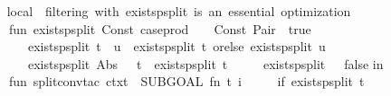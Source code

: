 \begin{isabellebody}
\ {\isacartoucheopen}\isanewline
local\ {\isacharparenleft}{\kern0pt}{\isacharasterisk}{\kern0pt}\ filtering\ with\ exists{\isacharunderscore}{\kern0pt}p{\isacharunderscore}{\kern0pt}split\ is\ an\ essential\ optimization\ {\isacharasterisk}{\kern0pt}{\isacharparenright}{\kern0pt}\isanewline
\ \ fun\ exists{\isacharunderscore}{\kern0pt}p{\isacharunderscore}{\kern0pt}split\ {\isacharparenleft}{\kern0pt}Const\ {\isacharparenleft}{\kern0pt}\isactrlconstUNDERSCOREname {\isasymopen}case{\isacharunderscore}{\kern0pt}prod{\isasymclose}{\isacharcomma}{\kern0pt}{\isacharunderscore}{\kern0pt}{\isacharparenright}{\kern0pt}\ {\isachardollar}{\kern0pt}\ {\isacharunderscore}{\kern0pt}\ {\isachardollar}{\kern0pt}\ {\isacharparenleft}{\kern0pt}Const\ {\isacharparenleft}{\kern0pt}\isactrlconstUNDERSCOREname {\isasymopen}Pair{\isasymclose}{\isacharcomma}{\kern0pt}{\isacharunderscore}{\kern0pt}{\isacharparenright}{\kern0pt}{\isachardollar}{\kern0pt}{\isacharunderscore}{\kern0pt}{\isachardollar}{\kern0pt}{\isacharunderscore}{\kern0pt}{\isacharparenright}{\kern0pt}{\isacharparenright}{\kern0pt}\ {\isacharequal}{\kern0pt}\ true\isanewline
\ \ \ \ {\isacharbar}{\kern0pt}\ exists{\isacharunderscore}{\kern0pt}p{\isacharunderscore}{\kern0pt}split\ {\isacharparenleft}{\kern0pt}t\ {\isachardollar}{\kern0pt}\ u{\isacharparenright}{\kern0pt}\ {\isacharequal}{\kern0pt}\ exists{\isacharunderscore}{\kern0pt}p{\isacharunderscore}{\kern0pt}split\ t\ orelse\ exists{\isacharunderscore}{\kern0pt}p{\isacharunderscore}{\kern0pt}split\ u\isanewline
\ \ \ \ {\isacharbar}{\kern0pt}\ exists{\isacharunderscore}{\kern0pt}p{\isacharunderscore}{\kern0pt}split\ {\isacharparenleft}{\kern0pt}Abs\ {\isacharparenleft}{\kern0pt}{\isacharunderscore}{\kern0pt}{\isacharcomma}{\kern0pt}\ {\isacharunderscore}{\kern0pt}{\isacharcomma}{\kern0pt}\ t{\isacharparenright}{\kern0pt}{\isacharparenright}{\kern0pt}\ {\isacharequal}{\kern0pt}\ exists{\isacharunderscore}{\kern0pt}p{\isacharunderscore}{\kern0pt}split\ t\isanewline
\ \ \ \ {\isacharbar}{\kern0pt}\ exists{\isacharunderscore}{\kern0pt}p{\isacharunderscore}{\kern0pt}split\ {\isacharunderscore}{\kern0pt}\ {\isacharequal}{\kern0pt}\ false{\isacharsemicolon}{\kern0pt}\isanewline
in\isanewline
\ \ fun\ split{\isacharunderscore}{\kern0pt}conv{\isacharunderscore}{\kern0pt}tac\ ctxt\ {\isacharequal}{\kern0pt}\ SUBGOAL\ {\isacharparenleft}{\kern0pt}fn\ {\isacharparenleft}{\kern0pt}t{\isacharcomma}{\kern0pt}\ i{\isacharparenright}{\kern0pt}\ {\isacharequal}{\kern0pt}{\isachargreater}{\kern0pt}\isanewline
\ \ \ \ if\ exists{\isacharunderscore}{\kern0pt}p{\isacharunderscore}{\kern0pt}split\ t\isanewline

\end{isabellebody}
